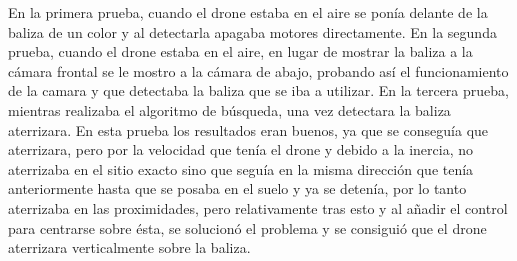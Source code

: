 \hspace{1cm} En la primera prueba, cuando el drone estaba en el aire se pon\'ia delante de la baliza de un color y al detectarla apagaba motores directamente. En la segunda prueba, cuando el drone estaba en el aire, en lugar de mostrar la baliza a la c\'amara frontal se le mostro a la c\'amara de abajo, probando as\'i el funcionamiento de la camara y que detectaba la baliza que se iba a utilizar. En la tercera prueba, mientras realizaba el algoritmo de b\'usqueda, una vez detectara la baliza aterrizara. En esta prueba los resultados eran buenos, ya que se consegu\'ia que aterrizara, pero por la velocidad que ten\'ia el drone y debido a la inercia, no aterrizaba en el sitio exacto sino que segu\'ia en la misma direcci\'on que ten\'ia anteriormente hasta que se posaba en el suelo y ya se deten\'ia, por lo tanto aterrizaba en las proximidades, pero relativamente tras esto y al añadir el control para centrarse sobre \'esta, se solucion\'o el problema y se consigui\'o que el drone aterrizara verticalmente sobre la baliza. 

